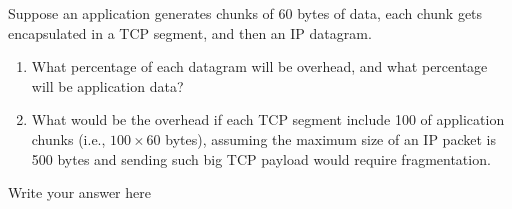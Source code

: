 \documentclass{report}
\begin{document}
\mktitle

\begin{problem}
Suppose an application generates chunks of 60 bytes of data, each chunk gets encapsulated in a TCP segment, and then an IP datagram.

\begin{enumerate}
\item What percentage of each datagram will be overhead, and what percentage will be application data?

\item What would be the overhead if each TCP segment include 100 of application chunks (i.e., $100 \times 60$ bytes), assuming the maximum size of an IP packet is 500 bytes and sending such big TCP payload would require fragmentation.
\end{enumerate}

\begin{answer}{40em}
    Write your answer here
\end{answer}

\end{problem}



\newpage
\end{document}
